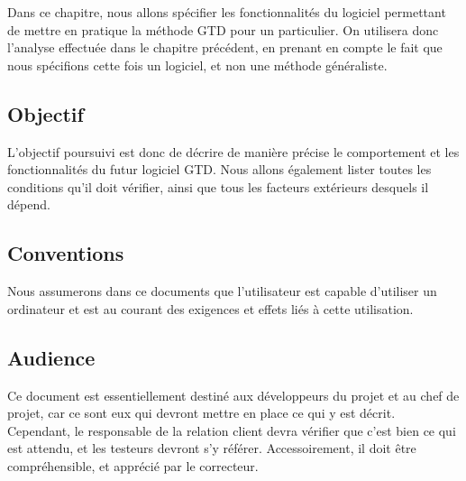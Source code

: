 Dans ce chapitre, nous allons spécifier les fonctionnalités du logiciel per\-met\-tant de mettre en pratique la méthode GTD pour un particulier.
 On utilisera donc l'analyse effectuée dans le chapitre précédent, en prenant en compte le fait que nous spécifions cette fois un logiciel, et non une méthode généraliste.


	\subsection{Objectif}

L'objectif poursuivi est donc de décrire de manière précise le comportement et les fonctionnalités du futur logiciel GTD.
 Nous allons également lister toutes les conditions qu'il doit vérifier, ainsi que tous les facteurs extérieurs desquels il dépend.

	\subsection{Conventions}


Nous assumerons dans ce documents que l'utilisateur est capable d'utiliser un ordinateur et est au courant des exigences et effets liés à cette utilisation.

	\subsection{Audience}

Ce document est essentiellement destiné aux développeurs du projet et au chef de projet, car ce sont eux qui devront mettre en place ce qui y est décrit.
Cependant, le responsable de la relation client devra vérifier que c'est bien ce qui est attendu, et les testeurs devront s'y référer.
Accessoirement, il doit être compréhensible, et apprécié par le correcteur.


